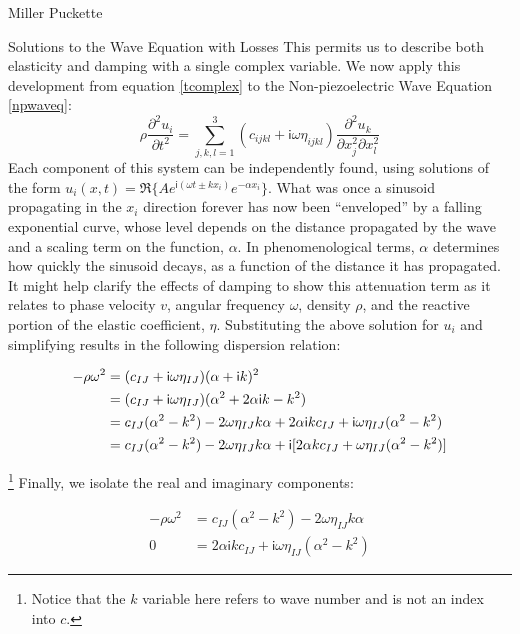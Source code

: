 \documentclass[a4paper,10pt]{report}
\numberwithin{equation}{section}
\begin{document}
\begin{chapter}{Miller Puckette}
\begin{section}{Solutions to the Wave Equation with Losses}
This permits us to describe both elasticity and damping with a single complex variable. We now apply this development from equation \eqref{tcomplex} to the Non-piezoelectric Wave Equation \eqref{npwaveq}:
\begin{equation}\label{dampednpwe}
 \rho\frac{\partial^2 u_i}{\partial t^2} = \sum_{j,k,l=1}^3(c_{ijkl} + \mathsf{i}\omega\eta_{ijkl})\frac{\partial^2 u_k}{\partial x_j^2 \partial x_l^2}
\end{equation}
Each component of this system can be independently found, using solutions of the form $u_i(x, t) = \Re\{A e^{\mathsf{i}(\omega t \pm kx_i)}e^{-\alpha x_i}\}$. What was once a sinusoid propagating in the $x_i$ direction forever has now been ``enveloped'' by a falling exponential curve, whose level depends on the distance propagated by the wave and a scaling term on the function, $\alpha$. In phenomenological terms, $\alpha$ determines how quickly the sinusoid decays, as a function of the distance it has propagated. It might help clarify the effects of damping to show this attenuation term as it relates to phase velocity $v$, angular frequency $\omega$, density $\rho$, and the reactive portion of the elastic coefficient, $\eta$. Substituting the above solution for $u_i$ and simplifying results in the following dispersion relation\cite[p.~12]{Nelson1992}\cite[p.~22]{Ballantine1997}:
\begin{singlespace}
\begin{align}\label{ddispersion}
 -\rho\omega^2 &= (c_{IJ}+\mathsf{i}\omega\eta_{IJ})(\alpha + \mathsf{i}k)^2\notag \\
 &= (c_{IJ}+\mathsf{i}\omega\eta_{IJ})(\alpha^2 + 2\alpha\mathsf{i}k - k^2)\\
 &= c_{IJ}(\alpha^2 - k^2) - 2\omega\eta_{IJ}k\alpha + 2\alpha\mathsf{i} k c_{IJ} + \mathsf{i}\omega\eta_{IJ}(\alpha^2 - k^2)\notag \\
 &= c_{IJ}(\alpha^2 - k^2) - 2\omega\eta_{IJ}k\alpha + \mathsf{i}[2\alpha k c_{IJ} + \omega\eta_{IJ}(\alpha^2 - k^2)] \notag
\end{align}
\end{singlespace}
\footnote{Notice that the $k$ variable here refers to wave number and is not an index into $c$.} Finally, we isolate the real and imaginary components:
\begin{singlespace}
 \begin{align}
  -\rho\omega^2 &= c_{IJ}(\alpha^2 - k^2) - 2\omega\eta_{IJ}k\alpha\label{rdispersion}\\
  0 &= 2\alpha\mathsf{i} k c_{IJ} + \mathsf{i}\omega\eta_{IJ}(\alpha^2 - k^2)\label{idispersion}

\end{align}
\end{singlespace}
\end{section}
\end{chapter}
\end{document}
